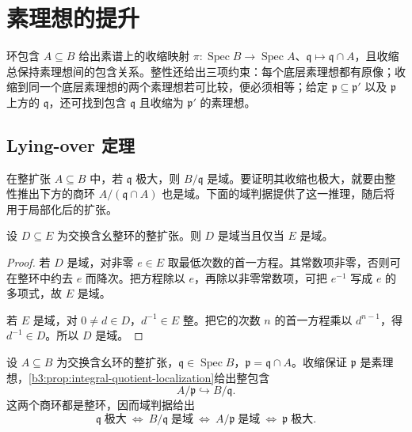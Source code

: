 
\section{素理想的提升}\label{b3:sec:0502}

环包含 \(A\subseteq B\) 给出素谱上的收缩映射 \(\pi:\operatorname{Spec}B\to\operatorname{Spec}A\)、\(\mathfrak q\mapsto\mathfrak q\cap A\)，且收缩总保持素理想间的包含关系。整性还给出三项约束：每个底层素理想都有原像；收缩到同一个底层素理想的两个素理想若可比较，便必须相等；给定 \(\mathfrak p\subseteq\mathfrak p'\) 以及 \(\mathfrak p\) 上方的 \(\mathfrak q\)，还可找到包含 \(\mathfrak q\) 且收缩为 \(\mathfrak p'\) 的素理想。

\subsection{Lying-over 定理}\label{b3:subsec:0502:01}

在整扩张 \(A\subseteq B\) 中，若 \(\mathfrak q\) 极大，则 \(B/\mathfrak q\) 是域。要证明其收缩也极大，就要由整性推出下方的商环 \(A/(\mathfrak q\cap A)\) 也是域。下面的域判据提供了这一推理，随后将用于局部化后的扩张。

\begin{lemma}\label{b3:lem:integral-field-criterion}
	设 \(D\subseteq E\) 为交换含幺整环的整扩张。则 \(D\) 是域当且仅当 \(E\) 是域。
\end{lemma}
\begin{proof}
	若 \(D\) 是域，对非零 \(e\in E\) 取最低次数的首一方程。其常数项非零，否则可在整环中约去 \(e\) 而降次。把方程除以 \(e\)，再除以非零常数项，可把 \(e^{-1}\) 写成 \(e\) 的多项式，故 \(E\) 是域。

	若 \(E\) 是域，对 \(0\ne d\in D\)，\(d^{-1}\in E\) 整。把它的次数 \(n\) 的首一方程乘以 \(d^{n-1}\)，得 \(d^{-1}\in D\)。所以 \(D\) 是域。
\end{proof}

设 \(A\subseteq B\) 为交换含幺环的整扩张，\(\mathfrak q\in\operatorname{Spec}B\)，\(\mathfrak p=\mathfrak q\cap A\)。收缩保证 \(\mathfrak p\) 是素理想，\cref{b3:prop:integral-quotient-localization}给出整包含
\[
	A/\mathfrak p\hookrightarrow B/\mathfrak q.
\]
这两个商环都是整环，因而域判据给出
\[
	\mathfrak q\;\text{极大} \ \Longleftrightarrow\ B/\mathfrak q\;\text{是域} \ \Longleftrightarrow\ A/\mathfrak p\;\text{是域} \ \Longleftrightarrow\ \mathfrak p\;\text{极大}.
\]

